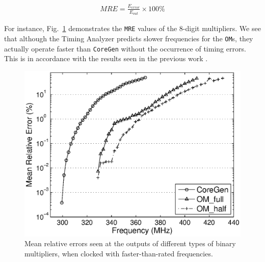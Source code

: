 \documentclass[conference]{IEEEtran}
\begin{document}
\begin{eqnarray}\label{Eq:MRE}
  MRE=\frac{E_{error}}{E_{out}}\times100\%
\end{eqnarray}

For instance, Fig.~\ref{Fig:PM_MRE} demonstrates the \texttt{MRE} values of the 8-digit multipliers. We see that although the Timing Analyzer predicts slower frequencies for the \texttt{OM}s, they actually operate faster than \texttt{CoreGen} without the occurrence of timing errors. This is in accordance with the results seen in the previous work \cite{SKDAC14_REVIEW}.

\begin{figure}[tbp]
  \centering
  \includegraphics[width=.48\textwidth]{./Figures/Exp/MRE_PM.eps}
  \caption{Mean relative errors seen at the outputs of different types of binary multipliers, when clocked with faster-than-rated frequencies.}
  \label{Fig:PM_MRE}
\end{figure}




%
\end{document}
